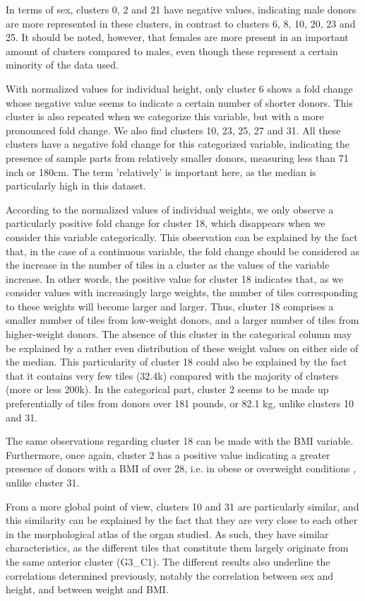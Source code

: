 \documentclass[a4paper, 11pt]{article}
\begin{document}
\begin{multicols}{2}
In terms of sex, clusters 0, 2 and 21 have negative values, indicating male donors are more represented in these clusters, in contrast to clusters 6, 8, 10, 20, 23 and 25. It should be noted, however, that females are more present in an important amount of clusters compared to males, even though these represent a certain minority of the data used. 

With normalized values for individual height, only cluster 6 shows a fold change whose negative value seems to indicate a certain number of shorter donors. This cluster is also repeated when we categorize this variable, but with a more pronounced fold change. We also find clusters 10, 23, 25, 27 and 31. All these clusters have a negative fold change for this categorized variable, indicating the presence of sample parts from relatively smaller donors, measuring less than 71 inch or 180cm. The term 'relatively' is important here, as the median is particularly high in this dataset.

According to the normalized values of individual weights, we only observe a particularly positive fold change for cluster 18, which disappears when we consider this variable categorically. This observation can be explained by the fact that, in the case of a continuous variable, the fold change should be considered as the increase in the number of tiles in a cluster as the values of the variable increase. In other words, the positive value for cluster 18 indicates that, as we consider values with increasingly large weights, the number of tiles corresponding to these weights will become larger and larger. Thus, cluster 18 comprises a smaller number of tiles from low-weight donors, and a larger number of tiles from higher-weight donors. The absence of this cluster in the categorical column may be explained by a rather even distribution of these weight values on either side of the median. This particularity of cluster 18 could also be explained by the fact that it contains very few tiles (32.4k) compared with the majority of clusters (more or less 200k). In the categorical part, cluster 2 seems to be made up preferentially of tiles from donors over 181 pounds, or 82.1 kg, unlike clusters 10 and 31.

The same observations regarding cluster 18 can be made with the BMI variable. Furthermore, once again, cluster 2 has a positive value indicating a greater presence of donors with a BMI of over 28, i.e. in obese or overweight conditions \citep{cdc_all_2022}, unlike cluster 31.

From a more global point of view, clusters 10 and 31 are particularly similar, and this similarity can be explained by the fact that they are very close to each other in the morphological atlas of the organ studied. As such, they have similar characteristics, as the different tiles that constitute them largely originate from the same anterior cluster (G3\_C1). The different results also underline the correlations determined previously, notably the correlation between sex and height, and between weight and BMI.


\end{multicols}
\end{document}
